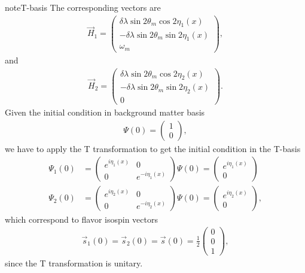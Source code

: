 \documentclass[letterpaper,12pt,english]{sphinxmanual}
\begin{document}
\begin{sphinxadmonition}{note}{T-basis}
The corresponding vectors are
\begin{equation*}
\begin{split}\vec H_1 = \begin{pmatrix}
\delta\lambda \sin 2\theta_m \cos 2\eta_1(x) \\
-\delta\lambda \sin 2\theta_m \sin 2\eta_1(x)\\
\omega_m
\end{pmatrix},\end{split}
\end{equation*}
and
\begin{equation*}
\begin{split}\vec H_2 = \begin{pmatrix}
\delta\lambda \sin 2\theta_m \cos 2\eta_2(x) \\
-\delta\lambda \sin 2\theta_m \sin 2\eta_2(x)\\
0
\end{pmatrix}.\end{split}
\end{equation*}
Given the initial condition in background matter basis
\begin{equation*}
\begin{split}\Psi(0) = \begin{pmatrix}
1 \\
0
\end{pmatrix},\end{split}
\end{equation*}
we have to apply the T transformation to get the initial condition in the T-basis
\begin{equation*}
\begin{split}\Psi_1(0) &=  \begin{pmatrix} e^{i \eta_1 (x)} & 0 \\  0 & e^{-i \eta_1 (x)}  \end{pmatrix}\Psi(0) = \begin{pmatrix} e^{i \eta_1 (x)} \\  0 \end{pmatrix} \\
\Psi_2(0) &=  \begin{pmatrix} e^{i \eta_2 (x)} & 0 \\  0 & e^{-i \eta_2 (x)}  \end{pmatrix}\Psi(0) = \begin{pmatrix} e^{i \eta_2 (x)} \\  0 \end{pmatrix},\end{split}
\end{equation*}
which correspond to flavor isospin vectors
\begin{equation*}
\begin{split}\vec s_1(0) = \vec s_2(0) = \vec s(0) = \frac{1}{2} \begin{pmatrix}
0 \\
0 \\
1
\end{pmatrix},\end{split}
\end{equation*}
since the T transformation is unitary.
\end{sphinxadmonition}
\end{document}
